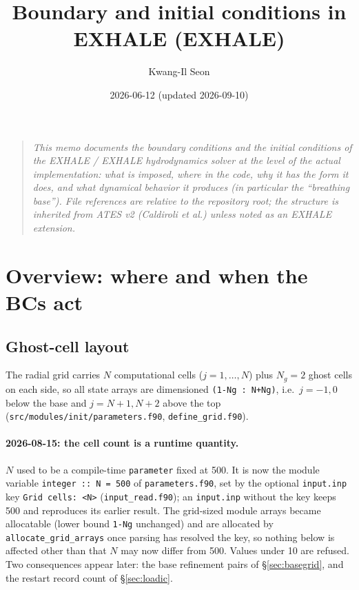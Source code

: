 \documentclass[english,a4paper]{my_memo}
\title{Boundary and initial conditions in EXHALE (EXHALE)}
\author{Kwang-Il Seon}
\date{2026-06-12 (updated 2026-09-10)}
\begin{document}
\maketitle

\begin{quote}\small\itshape
This memo documents the boundary conditions and the initial conditions
of the EXHALE / EXHALE hydrodynamics solver at the level of the
actual implementation: what is imposed, where in the code, why it has
the form it does, and what dynamical behavior it produces (in
particular the ``breathing base''). File references are relative to
the repository root; the structure is inherited from ATES v2
(Caldiroli et al.) unless noted as an EXHALE extension.
\end{quote}

\tableofcontents

\section{Overview: where and when the BCs act}
\label{sec:overview}

\subsection{Ghost-cell layout}

The radial grid carries $N$ computational cells ($j = 1,\dots,N$) plus
$N_g = 2$ ghost cells on each side, so all state arrays are dimensioned
\verb|(1-Ng : N+Ng)|, i.e.\ $j = -1, 0$
below the base and $j = N{+}1, N{+}2$ above the top
(\texttt{src/modules/init/parameters.f90}, \texttt{define\_grid.f90}).

\paragraph{2026-08-15: the cell count is a runtime quantity.}
$N$ used to be a compile-time \texttt{parameter} fixed at 500. It is now
the module variable \texttt{integer :: N = 500} of
\texttt{parameters.f90}, set by the optional \texttt{input.inp} key
\texttt{Grid cells: <N>} (\texttt{input\_read.f90}); an
\texttt{input.inp} without the key keeps 500 and reproduces its earlier
result. The grid-sized module arrays became allocatable (lower bound
\texttt{1-Ng} unchanged) and are allocated by
\texttt{allocate\_grid\_arrays} once parsing has resolved the key, so
nothing below is affected other than that $N$ may now differ from 500.
Values under 10 are refused. Two consequences appear later: the base
refinement pairs of \S\ref{sec:basegrid}, and the restart record count
of \S\ref{sec:loadic}.
\end{document}
